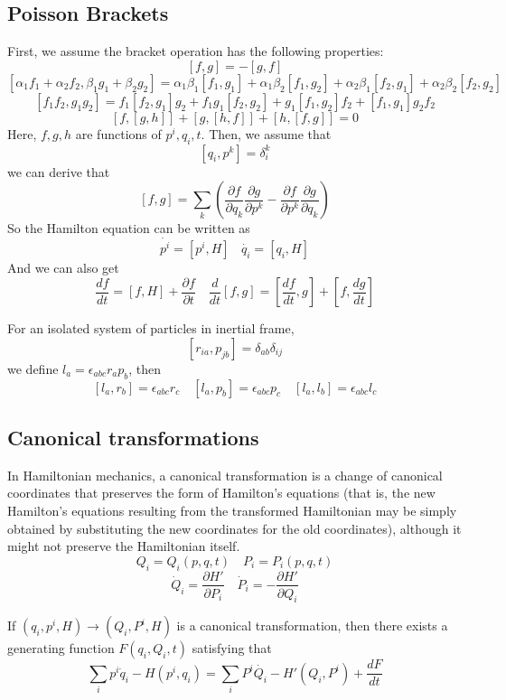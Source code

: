 \subsection{Poisson Brackets}
First, we assume the bracket operation has the following properties:
\[ \left[f,g\right]=-\left[g,f\right] \]
\[\left[\alpha_1 f_1+\alpha_2 f_2,\beta_1 g_1+\beta_2 g_2\right]=\alpha_1 \beta_1\left[f_1,g_1\right]
+\alpha_1 \beta_2\left[f_1,g_2\right]+\alpha_2 \beta_1\left[f_2,g_1\right]+\alpha_2 \beta_2\left[f_2,g_2\right]\]
\[\left[f_1 f_2,g_1 g_2\right]=f_1\left[f_2,g_1\right]g_2+f_1 g_1\left[f_2,g_2\right]+g_1\left[f_1,g_2\right]f_2 +\left[f_1,g_1\right]g_2 f_2 \]
\[\left[f,\left[g,h\right]\right]+\left[g,\left[h,f\right]\right]+\left[h,\left[f,g\right]\right]=0\]
Here, $f,g,h$ are functions of $p^i,q_i,t$.
Then, we assume that
\[\left [q_i,p^k\right ]=\delta^{k}_{i}\]
we can derive that 
\[ \left[f,g\right]=\sum_k(\frac{\partial f}{\partial q_k} \frac{\partial g}{\partial p^k} - \frac{\partial f}{\partial p^k} \frac{\partial g}{\partial q_k}  )\]
So the Hamilton equation can be written as
\[\dot{p^i}=\left[ p^i,H \right] \ \ \ \ \dot{q_i}=\left[ q_i,H \right]\]
And we can also get
\[\frac{df}{dt} = [f,H] + \frac{\partial f}{\partial t} \quad \frac{d}{dt} [f,g] = [\frac{df}{dt},g] + [f,\frac{dg}{dt}]\]
\begin{example}
 For an isolated system of particles in inertial frame, 
\[[r_{ia},p_{jb}] = \delta_{ab} \delta_{ij}\]
we define $l_a = \epsilon_{abc} r_{a} p_{b}$, then
\[[l_a,r_b] = \epsilon_{abc}r_c \quad [l_a,p_b] = \epsilon_{abc}p_c \quad [l_a,l_b] = \epsilon_{abc}l_c\]
\end{example}

\subsection{Canonical transformations}
In Hamiltonian mechanics, a canonical transformation is a change of canonical coordinates that preserves the form of Hamilton's equations (that is, the new Hamilton's equations resulting from the transformed Hamiltonian may be simply obtained by substituting the new coordinates for the old coordinates), although it might not preserve the Hamiltonian itself. 
\[Q_i = Q_i(p,q,t) \quad P_i=P_i(p,q,t)\]
\[\dot{Q}_i = \frac{\partial H'}{\partial P_i} \quad \dot{P}_i = -\frac{\partial H'}{\partial Q_i}\]

\begin{newprop}
If $(q_i,p^i,H) \to (Q_i,P^i,H)$ is a canonical transformation, then there exists a generating function $F(q_i,Q_i,t)$ satisfying that
\[\sum_i p^i\dot{q}_i-H(p^i,q_i) = \sum_i P^i\dot{Q_i} - H'(Q_i,P^i) + \frac{dF}{dt}\]
\end{newprop}

